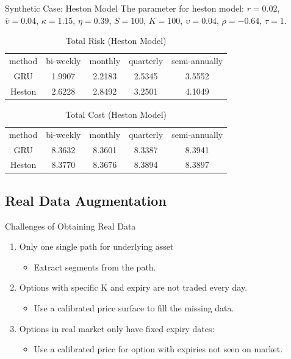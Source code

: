 \documentclass[10pt,table,mathserif]{beamer}
\begin{document}
\begin{frame}{Synthetic Case: Heston Model}
The parameter for heston model: $r=0.02$, $\overline{\upsilon}=0.04$, $\kappa=1.15$, $\eta=0.39$, $S=100$, $K=100$, $\upsilon=0.04$, $\rho=-0.64$, $\tau=1$.
\begin{table}[htp!]
	\centering
	\begin{tabular}{|c|c|c|c|c|}
		\hline
	method       &bi-weekly &monthly&quarterly&semi-annually \\
		GRU &1.9907 &2.2183&2.5345  &3.5552  \\
		Heston         &2.6228& 2.8492& 3.2501 & 4.1049 \\
		\hline
	\end{tabular}
	\caption{Total Risk (Heston Model)}
\end{table}


\begin{table}[htp!]
	\centering
	\begin{tabular}{|c|c|c|c|c|}
		\hline
	method       &bi-weekly &monthly&quarterly&semi-annually \\
		GRU &8.3632&8.3601&8.3387& 8.3941 \\
		Heston         &8.3770&8.3676&8.3894&8.3897 \\
		\hline
	\end{tabular}
	\caption{Total Cost (Heston Model)}
\end{table}
\end{frame}

\subsection{Real Data Augmentation}
\begin{frame}{Challenges of Obtaining Real Data}
\begin{enumerate}
	\item Only one single path for underlying asset
	\begin{itemize}
		\item Extract segments from the path.
	\end{itemize}
	\item Options with specific K and expiry are not traded every day.
	\begin{itemize}
	\item Use a calibrated price surface to fill the missing data. 
	\end{itemize}
	\item Options in real market only have fixed expiry dates:
		\begin{itemize}
	\item Use a calibrated price for option with expiries not seen on market.
		\end{itemize}
\end{enumerate}
\end{frame}
\end{document}

